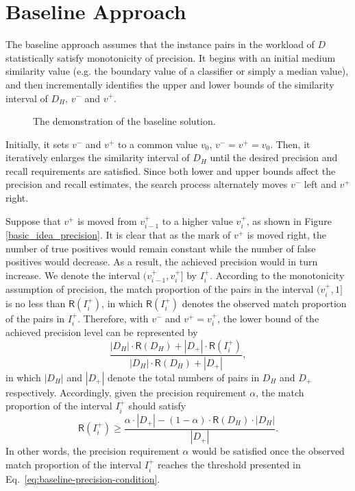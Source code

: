 \section{Baseline Approach}\label{sec:conservative}

  The baseline approach assumes that the instance pairs in the workload of $D$ statistically satisfy monotonicity of precision. It begins with an initial medium similarity value (e.g. the boundary value of a classifier or simply a median value), and then incrementally identifies the upper and lower bounds of the similarity interval of $D_H$, $v^-$ and $v^+$.

\begin{figure}[!htb]
\setlength{\abovecaptionskip}{\figcaptionspace}
\centering
{}
\caption{The demonstration of the baseline solution.}
\end{figure}

   Initially, it sets $v^-$ and $v^+$ to a common value $v_0$, $v^-=v^+=v_0$. Then, it iteratively enlarges the similarity interval of $D_H$ until the desired precision and recall requirements are satisfied. Since both lower and upper bounds affect the precision and recall estimates, the search process alternately moves $v^-$ left and $v^+$ right.

  Suppose that $v^+$ is moved from $v_{i-1}^+$ to a higher value $v_i^+$, as shown in Figure \ref{basic_idea_precision}. It is clear that as the mark of $v^+$ is moved right, the number of true positives would remain constant while the number of false positives would decrease. As a result, the achieved precision would in turn increase. We denote the interval $(v_{i-1}^+,v_i^+]$ by $I_i^+$. According to the monotonicity assumption of precision, the match proportion of the pairs in the interval $(v_i^+,1]$ is no less than $\mathsf{R}(I_i^+)$, in which $\mathsf{R}(I_i^+)$ denotes the observed match proportion of the pairs in $I_i^+$. Therefore, with $v^-$ and $v^+=v_i^+$, the lower bound of the achieved precision level can be represented by
\begin{equation}
  \frac{|D_H|\cdot \mathsf{R}(D_H)+|D_+|\cdot \mathsf{R}(I_i^+)}{|D_H|\cdot \mathsf{R}(D_H)+|D_+|},
\end{equation}
in which $|D_H|$ and $|D_+|$ denote the total numbers of pairs in $D_H$ and $D_+$ respectively. Accordingly, given the precision requirement $\alpha$, the match proportion of the interval $I_i^+$ should satisfy
\begin{equation}
\mathsf{R}(I_i^+)\geq\frac{\alpha\cdot |D_+|-(1-\alpha)\cdot \mathsf{R}(D_H)\cdot |D_H|}{|D_+|}.
\label{eq:baseline-precision-condition}
\end{equation}
In other words, the precision requirement $\alpha$ would be satisfied once the observed match proportion of the interval $I_i^+$ reaches the threshold presented in Eq.~\ref{eq:baseline-precision-condition}.


